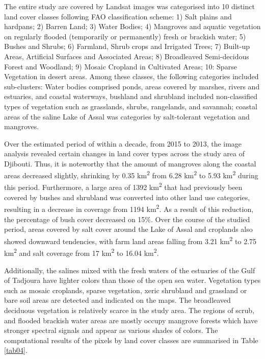 \documentclass[jimaging,article,submit,pdftex,moreauthors]{Definitions/mdpi}
\begin{document}
{The entire study are covered by Landsat images was categorised into 10 distinct land cover classes following FAO classification scheme: 1) Salt plains and hardpans; 2) Barren Land; 3) Water Bodies; 4) Mangroves and aquatic vegetation on regularly flooded (temporarily or permanently) fresh or brackish water; 5) Bushes and Shrubs; 6) Farmland, Shrub crops and Irrigated Trees; 7) Built-up Areas, Artificial Surfaces and Associated Areas; 8) Broadleaved Semi-decidous Forest and Woodland; 9) Mosaic Cropland in Cultivated Areas; 10: Sparse Vegetation in desert areas. Among these classes, the following categories included sub-clusters: Water bodies comprised ponds, areas covered by marshes, rivers and estuaries, and coastal waterways, bushland and shrubland included non-classified types of vegetation such as grasslands, shrubs, rangelands, and savannah; coastal areas of the saline Lake of Assal was categories by salt-tolerant vegetation and mangroves.}

{Over the estimated period of within a decade, from 2015 to 2013, the image analysis revealed certain changes in land cover types across the study area of Djibouti. Thus, it is noteworthy that the amount of mangroves along the coastal areas decreased slightly, shrinking by 0.35 km\textsuperscript{2} from 6.28 km\textsuperscript{2} to 5.93 km\textsuperscript{2} during this period. Furthermore, a large area of 1392 km\textsuperscript{2} that had previously been covered by bushes and shrubland was converted into other land use categories, resulting in a decrease in coverage from 1194 km\textsuperscript{2}. As a result of this reduction, the percentage of bush cover decreased on 15\%. Over the course of the studied period, areas covered by salt cover around the Lake of Assal and croplands also showed downward tendencies, with farm land areas falling from 3.21 km\textsuperscript{2} to 2.75 km\textsuperscript{2} and salt coverage from 17 km\textsuperscript{2} to 16.04 km\textsuperscript{2}.}

Additionally, the salines mixed with the fresh waters of the estuaries of the Gulf of Tadjoura have lighter colors than those of the open sea water. Vegetation types such as mosaic croplands, sparse vegetation, xeric shrubland and grassland or bare soil areas are detected and indicated on the maps. The broadleaved deciduous vegetation is relatively scarce in the study area. The regions of scrub, and flooded brackish water areas are mostly occupy mangrove forests which have stronger spectral signals and appear as various shades of colors. The computational results of the pixels by land cover classes are summarised in Table \ref{tab04}.
\end{document}
